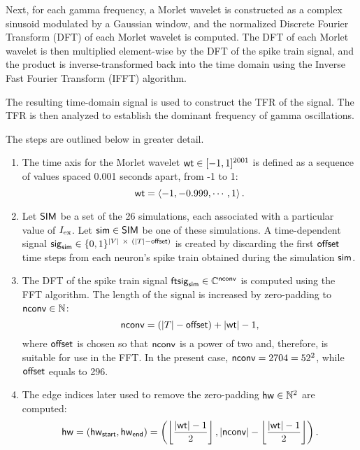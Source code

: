 Next, for each gamma frequency, a Morlet wavelet is constructed as a complex sinusoid modulated by a Gaussian window, and the normalized Discrete Fourier Transform (DFT) of each Morlet wavelet is computed. The DFT of each Morlet wavelet is then multiplied element-wise by the DFT of the spike train signal, and the product is inverse-transformed back into the time domain using the Inverse Fast Fourier Transform (IFFT) algorithm.

The resulting time-domain signal is used to construct the TFR of the signal. The TFR is then analyzed to establish the dominant frequency of gamma oscillations. 

The steps are outlined below in greater detail.

\begin{enumerate}
    \item The time axis for the Morlet wavelet $\mathsf{wt} \in [-1, 1]^{2001}$ is defined as a sequence of values spaced 0.001 seconds apart, from -1 to 1:
    \begin{equation}
        \mathsf{wt} = \left<
        -1, -0.999, \cdots, 1
        \right>.
    \end{equation}

    \item Let $\mathsf{SIM}$ be a set of the 26 simulations, each associated with a particular value of $I_{\mathrm{ex}}$. Let $\mathsf{sim} \in \mathsf{SIM}$ be one of these simulations. A time-dependent signal $\spikesignal_\tfrsimulation \in \{0, 1\} ^ {|V| \ \times \ (|\timesteps| - \offset)}$ is created by discarding the first $\mathsf{offset}$ time steps from each neuron's spike train obtained during the simulation $\mathsf{sim}$. 

    \item 
    The DFT of the spike train signal $\mathsf{ft}\mathsf{sig}_{\mathsf{sim}} \in \mathbb{C}^{\mathsf{nconv}}$ is computed using the FFT algorithm. The length of the signal is increased by zero-padding to $\mathsf{nconv} \in \mathbb{N}$:
    \begin{equation}
        \mathsf{nconv} = (|T| - \mathsf{offset}) + |\mathsf{wt}| - 1,
    \end{equation}
    where $\mathsf{offset}$ is chosen so that $\mathsf{nconv}$ is a power of two and, therefore, is suitable for use in the FFT. 
    In the present case, $\mathsf{nconv} = 2704 = 52^2$, while $\mathsf{offset}$ equals to 296.

    \item The edge indices later used to remove the zero-padding $\mathsf{hw} \in \mathbb{N}^2$ are computed:
    \begin{equation}
        \mathsf{hw}
        = 
        (\mathsf{hw}_{\mathsf{start}}, \mathsf{hw}_{\mathsf{end}}) 
        =
        \left(
            \left\lfloor 
                \frac{
                    |\mathsf{wt}| - 1         
                }{2}
             \right\rfloor,
            |\mathsf{nconv}| - \left\lfloor 
                \frac{
                    |\mathsf{wt}| - 1         
                }{2}
             \right\rfloor
        \right).
    \end{equation}


\end{enumerate}
